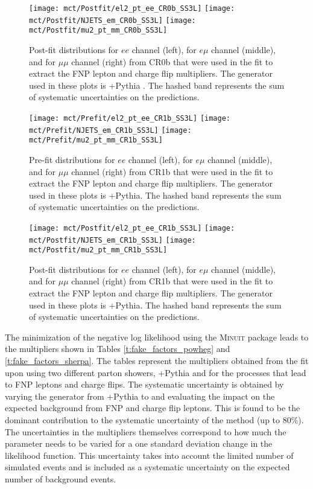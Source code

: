 \begin{figure}[htb!]
  \texttt{[image: mct/Postfit/el2\_pt\_ee\_CR0b\_SS3L]}
  \texttt{[image: mct/Postfit/NJETS\_em\_CR0b\_SS3L]}
  \texttt{[image: mct/Postfit/mu2\_pt\_mm\_CR0b\_SS3L]}
\caption{
Post-fit distributions for  $ee$ channel (left),  for  $e\mu$ channel (middle), and  for  $\mu\mu$ channel (right) from CR0b that were used in the fit to extract the FNP lepton and charge flip multipliers.
The generator used in these plots is  \POWHEGBOX+Pythia . The hashed band represents the sum of systematic uncertainties on the predictions.
\label{f:postfit_CR0b}
}
\end{figure}

 \begin{figure}[!htb]
   \texttt{[image: mct/Prefit/el2\_pt\_ee\_CR1b\_SS3L]}
   \texttt{[image: mct/Prefit/NJETS\_em\_CR1b\_SS3L]}
   \texttt{[image: mct/Prefit/mu2\_pt\_mm\_CR1b\_SS3L]}
 \caption{
 Pre-fit distributions for  $ee$ channel (left), for  $e\mu$ channel (middle), and  for  $\mu\mu$ channel (right) from CR1b that were used in the fit to extract the FNP lepton and charge flip multipliers.
The generator used in these plots is  \POWHEGBOX+Pythia. The hashed band represents the sum of systematic uncertainties on the predictions.
 \label{f:prefit_CR1b}
 }
 \end{figure}

\begin{figure}[!htb]
  \texttt{[image: mct/Postfit/el2\_pt\_ee\_CR1b\_SS3L]}
  \texttt{[image: mct/Postfit/NJETS\_em\_CR1b\_SS3L]}
  \texttt{[image: mct/Postfit/mu2\_pt\_mm\_CR1b\_SS3L]}
\caption{
Post-fit distributions for  $ee$ channel (left), for  $e\mu$ channel (middle), and  for  $\mu\mu$ channel (right) from CR1b that were used in the fit to extract the FNP lepton and charge flip multipliers.
The generator used in these plots is  \POWHEGBOX+Pythia. The hashed band represents the sum of systematic uncertainties on the predictions.
\label{f:postfit_CR1b}
}
\end{figure}

The minimization of the negative log likelihood using the \textsc{Minuit} package leads 
to the multipliers shown in Tables \ref{t:fake_factors_powheg} and \ref{t:fake_factors_sherpa}.
The tables represent the multipliers obtained from the fit upon using two different parton showers, \POWHEGBOX+Pythia and \SHERPA 
for the processes that lead to FNP leptons and charge flips.
The systematic uncertainty is obtained by varying the 
generator from \POWHEGBOX+Pythia to \SHERPA and evaluating the impact on the expected background from FNP and charge flip leptons. 
This is found to be the dominant contribution to the systematic uncertainty of the method (up to 80\%).
The uncertainties in the multipliers themselves correspond to how much the parameter needs to be varied for 
a one standard deviation change in the likelihood function. This uncertainty takes into account the limited number of simulated events and is included as a 
systematic uncertainty on the expected number of background events. 

